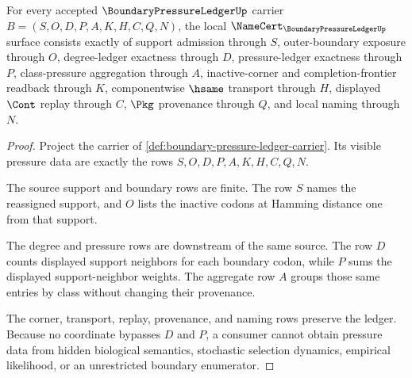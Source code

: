 \begin{theorem}
\label{thm:boundary-pressure-ledger-namecert-obligations}
For every accepted $\BoundaryPressureLedgerUp$ carrier $B=(S,O,D,P,A,K,H,C,Q,N)$, the local $\NameCert_{\BoundaryPressureLedgerUp}$ surface consists exactly of support admission through $S$, outer-boundary exposure through $O$, degree-ledger exactness through $D$, pressure-ledger exactness through $P$, class-pressure aggregation through $A$, inactive-corner and completion-frontier readback through $K$, componentwise $\hsame$ transport through $H$, displayed $\Cont$ replay through $C$, $\Pkg$ provenance through $Q$, and local naming through $N$.
\end{theorem}
\begin{proof}
Project the carrier of \autoref{def:boundary-pressure-ledger-carrier}. Its visible pressure data are exactly the rows $S,O,D,P,A,K,H,C,Q,N$.

The source support and boundary rows are finite. The row $S$ names the reassigned support, and $O$ lists the inactive codons at Hamming distance one from that support.

The degree and pressure rows are downstream of the same source. The row $D$ counts displayed support neighbors for each boundary codon, while $P$ sums the displayed support-neighbor weights. The aggregate row $A$ groups those same entries by class without changing their provenance.

The corner, transport, replay, provenance, and naming rows preserve the ledger. Because no coordinate bypasses $D$ and $P$, a consumer cannot obtain pressure data from hidden biological semantics, stochastic selection dynamics, empirical likelihood, or an unrestricted boundary enumerator.
\end{proof}

